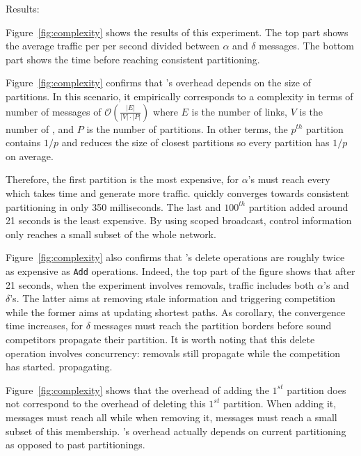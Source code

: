 \begin{asparadesc}
\begin{figure}
\end{figure}

\item [Results:]

Figure~\ref{fig:complexity} shows the results of this experiment. The
top part shows the average traffic per \process per second divided
between $\alpha$ and $\delta$ messages. The bottom part shows the time
before reaching consistent partitioning.

\noindent Figure~\ref{fig:complexity} confirms that \NAME's overhead
depends on the size of partitions. In this scenario, it empirically
corresponds to a complexity in terms of number of messages of
$\mathcal{O}(\frac{|E|}{|V|\cdot|P|})$ where $E$ is the number of
links, $V$ is the number of \processes, and $P$ is the number of
partitions. In other terms, the $p^{th}$ partition contains $1/p$
\processes and reduces the size of closest partitions so every
partition has $1/p$ \processes on average.
  
\noindent Therefore, the first partition is the most expensive, for $\alpha$'s
must reach every \process which takes time and generate more traffic.
\NAME quickly converges towards consistent partitioning in only 350
milliseconds. The last and $100^{th}$ partition added around 21
seconds is the least expensive. By using scoped broadcast, control
information only reaches a small subset of the whole network.

\noindent Figure~\ref{fig:complexity} also confirms that \NAME's
delete operations are roughly twice as expensive as \texttt{Add}
operations. Indeed, the top part of the figure shows that after 21
seconds, when the experiment involves removals, traffic includes both
$\alpha$'s and $\delta$'s. The latter aims at removing stale
information and triggering competition while the former aims at
updating shortest paths. As corollary, the convergence time increases,
for $\delta$ messages must reach the partition borders before sound
competitors propagate their partition. It is worth noting that this
delete operation involves concurrency: removals still propagate while
the competition has started. %
propagating.

\noindent Figure~\ref{fig:complexity} shows that the overhead of
adding the $1^{st}$ partition does not correspond to the overhead of
deleting this $1^{st}$ partition. When adding it, messages must reach
all \processes while when removing it, messages must reach a small
subset of this membership.  \NAME's overhead actually depends on
current partitioning as opposed to past partitionings.


\end{asparadesc}
